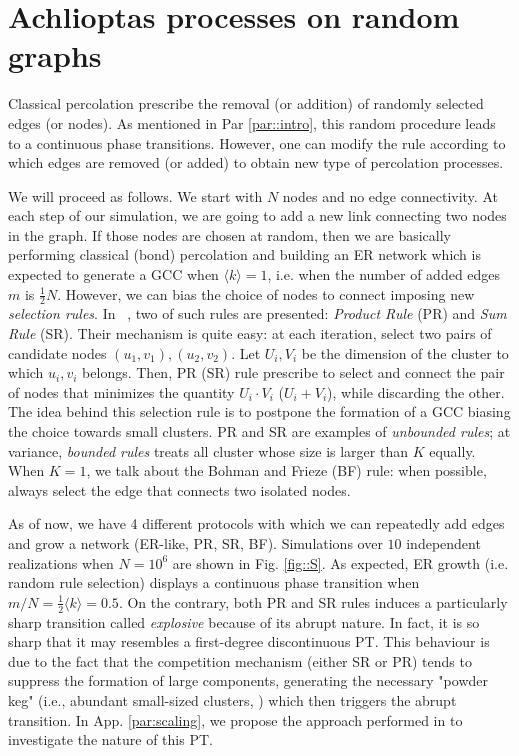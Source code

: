 \section{Achlioptas processes on random graphs}
Classical percolation prescribe the removal (or addition) of randomly selected edges (or nodes). As mentioned in Par \ref{par::intro}, this random procedure leads to a continuous phase transitions. However, one can modify the rule according to which edges are removed (or added) to obtain new type of percolation processes.

We will proceed as follows. We start with $N$ nodes and no edge connectivity. At each step of our simulation, we are going to add a new link connecting two nodes in the graph. If those nodes are chosen at random, then we are basically performing classical (bond) percolation and building an ER network which is expected to generate a GCC when $\langle k \rangle = 1$, i.e. when the number of added edges $m$ is $\frac{1}{2}N$. However, we can bias the choice of nodes to connect imposing new \textit{selection rules}. In ~\cite{Achlioptas}, two of such rules are presented: \textit{Product Rule} (PR) and \textit{Sum Rule} (SR). Their mechanism is quite easy: at each iteration, select two pairs of candidate nodes $(u_1, v_1), (u_2, v_2)$. Let $U_i, V_i$ be the dimension of the cluster to which $u_i, v_i$ belongs. Then, PR (SR) rule prescribe to select and connect the pair of nodes that minimizes the quantity $U_i \cdot V_i$ ($U_i + V_i$), while discarding the other. The idea behind this selection rule is to postpone the formation of a GCC biasing the choice towards small clusters. PR and SR are examples of \textit{unbounded rules}; at variance, \textit{bounded rules} treats all cluster whose size is larger than $K$ equally. When $K=1$, we talk about the Bohman and Frieze (BF) rule: when possible, always select the edge that connects two isolated nodes. 

As of now, we have 4 different protocols with which we can repeatedly add edges and grow a network (ER-like, PR, SR, BF). Simulations over $10$ independent realizations when $N = 10^6$ are shown in Fig. \ref{fig::S}. As expected, ER growth (i.e. random rule selection) displays a continuous phase transition when $m/N = \frac{1}{2}\langle k \rangle = 0.5$. On the contrary, both PR and SR rules induces a particularly sharp transition called \textit{explosive} because of its abrupt nature. In fact, it is so sharp that it may resembles a first-degree discontinuous PT. This behaviour is due to the fact that the competition mechanism (either SR or PR) tends to suppress the formation of large components, generating the necessary "powder keg" (i.e., abundant small-sized clusters, \cite{bibid}) which then triggers the abrupt transition. In App. \ref{par:scaling}, we propose the approach performed in \cite{Achlioptas} to investigate the nature of this PT. 

